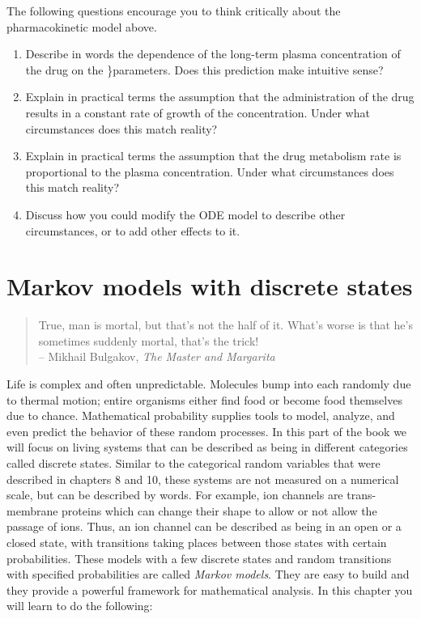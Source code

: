 \documentclass[
  letterpaper,
  DIV=11,
  numbers=noendperiod]{scrreprt}
\begin{document}
The following questions encourage you to think critically about the
pharmacokinetic model above.

\begin{enumerate}
\def\labelenumi{\arabic{enumi}.}
\item
  Describe in words the dependence of the long-term plasma concentration
  of the drug on the \}parameters. Does this prediction make intuitive
  sense?
\item
  Explain in practical terms the assumption that the administration of
  the drug results in a constant rate of growth of the concentration.
  Under what circumstances does this match reality?
\item
  Explain in practical terms the assumption that the drug metabolism
  rate is proportional to the plasma concentration. Under what
  circumstances does this match reality?
\item
  Discuss how you could modify the ODE model to describe other
  circumstances, or to add other effects to it.
\end{enumerate}


\hypertarget{markov-models-with-discrete-states}{%
\chapter{Markov models with discrete
states}\label{markov-models-with-discrete-states}}

\begin{quote}
True, man is mortal, but that's not the half of it. What's worse is that
he's sometimes suddenly mortal, that's the trick!\\
-- Mikhail Bulgakov, \emph{The Master and Margarita}
\end{quote}

Life is complex and often unpredictable. Molecules bump into each
randomly due to thermal motion; entire organisms either find food or
become food themselves due to chance. Mathematical probability supplies
tools to model, analyze, and even predict the behavior of these random
processes. In this part of the book we will focus on living systems that
can be described as being in different categories called discrete
states. Similar to the categorical random variables that were described
in chapters 8 and 10, these systems are not measured on a numerical
scale, but can be described by words. For example, ion channels are
trans-membrane proteins which can change their shape to allow or not
allow the passage of ions. Thus, an ion channel can be described as
being in an open or a closed state, with transitions taking places
between those states with certain probabilities. These models with a few
discrete states and random transitions with specified probabilities are
called \emph{Markov models}. They are easy to build and they provide a
powerful framework for mathematical analysis. In this chapter you will
learn to do the following:
\end{document}
